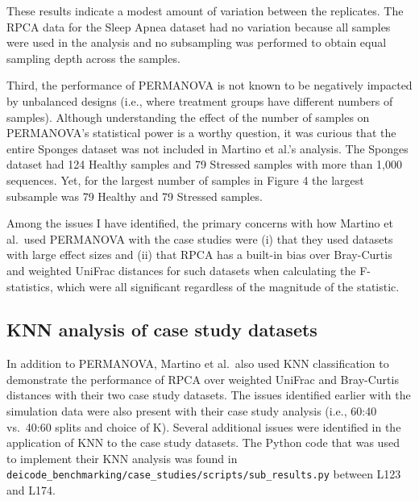\documentclass[
]{article}
\begin{document}
\normalsize{}

These results indicate a modest amount of variation between the
replicates. The RPCA data for the Sleep Apnea dataset had no variation
because all samples were used in the analysis and no subsampling was
performed to obtain equal sampling depth across the samples.

Third, the performance of PERMANOVA is not known to be negatively
impacted by unbalanced designs (i.e., where treatment groups have
different numbers of samples). Although understanding the effect of the
number of samples on PERMANOVA's statistical power is a worthy question,
it was curious that the entire Sponges dataset was not included in
Martino et al.'s analysis. The Sponges dataset had 124 Healthy samples
and 79 Stressed samples with more than 1,000 sequences. Yet, for the
largest number of samples in Figure 4 the largest subsample was 79
Healthy and 79 Stressed samples.

Among the issues I have identified, the primary concerns with how
Martino et al.~used PERMANOVA with the case studies were (i) that they
used datasets with large effect sizes and (ii) that RPCA has a built-in
bias over Bray-Curtis and weighted UniFrac distances for such datasets
when calculating the F-statistics, which were all significant regardless
of the magnitude of the statistic.

\subsection{KNN analysis of case study
datasets}\label{knn-analysis-of-case-study-datasets}

In addition to PERMANOVA, Martino et al.~also used KNN classification to
demonstrate the performance of RPCA over weighted UniFrac and
Bray-Curtis distances with their two case study datasets. The issues
identified earlier with the simulation data were also present with their
case study analysis (i.e., 60:40 vs.~40:60 splits and choice of K).
Several additional issues were identified in the application of KNN to
the case study datasets. The Python code that was used to implement
their KNN analysis was found in
\texttt{deicode\_benchmarking/case\_studies/scripts/sub\_results.py}
between L123 and L174.

\footnotesize
\end{document}
